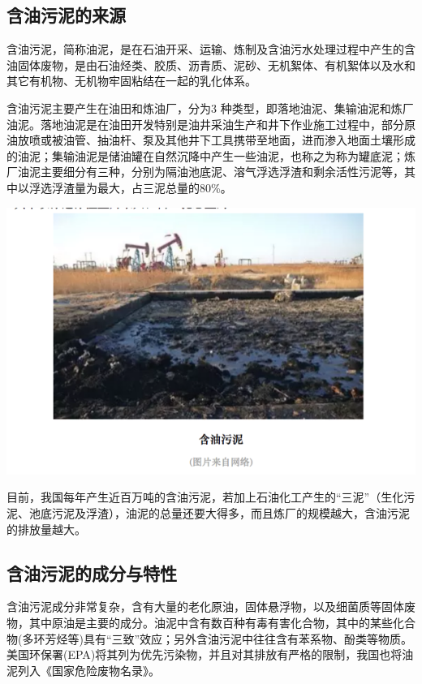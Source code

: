 \documentclass[]{book}
\begin{document}
\hypertarget{ux542bux6cb9ux6c61ux6ce5ux7684ux6765ux6e90}{%
\subsection{含油污泥的来源}\label{ux542bux6cb9ux6c61ux6ce5ux7684ux6765ux6e90}}

含油污泥，简称油泥，是在石油开采、运输、炼制及含油污水处理过程中产生的含油固体废物，是由石油烃类、胶质、沥青质、泥砂、无机絮体、有机絮体以及水和其它有机物、无机物牢固粘结在一起的乳化体系。

含油污泥主要产生在油田和炼油厂，分为3 种类型，即落地油泥、集输油泥和炼厂油泥。落地油泥是在油田开发特别是油井采油生产和井下作业施工过程中，部分原油放喷或被油管、抽油杆、泵及其他井下工具携带至地面，进而渗入地面土壤形成的油泥；集输油泥是储油罐在自然沉降中产生一些油泥，也称之为称为罐底泥；炼厂油泥主要细分有三种，分别为隔油池底泥、溶气浮选浮渣和剩余活性污泥等，其中以浮选浮渣量为最大，占三泥总量的80\%。

\includegraphics[width=8.33in]{images/youni3}

目前，我国每年产生近百万吨的含油污泥，若加上石油化工产生的``三泥''（生化污泥、池底污泥及浮渣），油泥的总量还要大得多，而且炼厂的规模越大，含油污泥的排放量越大。

\hypertarget{ux542bux6cb9ux6c61ux6ce5ux7684ux6210ux5206ux4e0eux7279ux6027}{%
\subsection{含油污泥的成分与特性}\label{ux542bux6cb9ux6c61ux6ce5ux7684ux6210ux5206ux4e0eux7279ux6027}}

含油污泥成分非常复杂，含有大量的老化原油，固体悬浮物，以及细菌质等固体废物，其中原油是主要的成分。油泥中含有数百种有毒有害化合物，其中的某些化合物(多环芳烃等)具有``三致''效应；另外含油污泥中往往含有苯系物、酚类等物质。美国环保署(EPA)将其列为优先污染物，并且对其排放有严格的限制，我国也将油泥列入《国家危险废物名录》。
\end{document}
